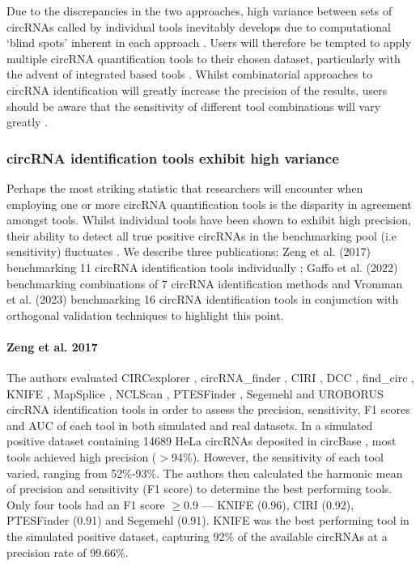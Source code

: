 \documentclass[pdflatex,sn-mathphys-num]{sn-jnl}
\begin{document}
Due to the discrepancies in the two approaches, high variance between sets of circRNAs called by individual tools inevitably develops due to computational `blind spots' inherent in each approach \cite{Szabo2016Oct}. Users will therefore be tempted to apply multiple circRNA quantification tools to their chosen dataset, particularly with the advent of integrated based tools \cite{RAISE,CirComPara,CirComPara2,Digby2023Dec,circRNAwrap}. Whilst combinatorial approaches to circRNA identification will greatly increase the precision of the results, users should be aware that the sensitivity of different tool combinations will vary greatly \cite{Hansen2016Apr,Szabo2016Oct,Hansen2018,Zeng2017Jun,Vromman2023Aug}.

\subsubsection*{circRNA identification tools exhibit high variance}
Perhaps the most striking statistic that researchers will encounter when employing one or more circRNA quantification tools is the disparity in agreement amongst tools. Whilst individual tools have been shown to exhibit high precision, their ability to detect all true positive circRNAs in the benchmarking pool (i.e sensitivity) fluctuates \cite{Vromman2023Aug,Zeng2017Jun}. We describe three publications: Zeng et al. (2017) benchmarking 11 circRNA identification tools individually \cite{Zeng2017Jun}; Gaffo et al. (2022) benchmarking combinations of 7 circRNA identification methods \cite{CirComPara2} and Vromman et al. (2023) benchmarking 16 circRNA identification tools in conjunction with orthogonal validation techniques \cite{Vromman2023Aug} to highlight this point. \par

\paragraph*{Zeng et al. 2017}
The authors evaluated CIRCexplorer \cite{CIRCexplorer}, circRNA\_finder \cite{circRNA_finder}, CIRI \cite{CIRI}, DCC \cite{DCC}, find\_circ \cite{find_circ}, KNIFE \cite{KNIFE}, MapSplice \cite{MapSplice}, NCLScan \cite{NCLscan}, PTESFinder \cite{PTESfinder}, Segemehl \cite{segemehl} and UROBORUS \cite{UROBORUS} circRNA identification tools in order to assess the precision, sensitivity, F1 scores and AUC of each tool in both simulated and real datasets. In a simulated positive dataset containing 14689 HeLa circRNAs deposited in circBase \cite{circbase}, most tools achieved high precision ($>$94\%). However, the sensitivity of each tool varied, ranging from 52\%-93\%. The authors then calculated the harmonic mean of precision and sensitivity (F1 score) to determine the best performing tools. Only four tools had an F1 score $\geq$0.9 --- KNIFE (0.96), CIRI (0.92), PTESFinder (0.91) and Segemehl (0.91). KNIFE was the best performing tool in the simulated positive dataset, capturing 92\% of the available circRNAs at a precision rate of 99.66\%. \par
\end{document}
